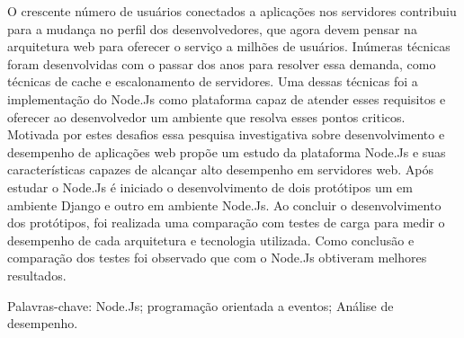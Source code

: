 \begin{resumo}
\vspace{-1cm}

\onehalfspacing

\noindent
  
  O crescente número de usuários conectados a aplicações nos servidores contribuiu
  para  a mudança no perfil dos desenvolvedores, que agora devem pensar na arquitetura web 
  para oferecer o serviço a milhões de usuários. Inúmeras técnicas foram desenvolvidas 
  com o passar dos anos para resolver essa demanda, como técnicas de cache e escalonamento de servidores.
  Uma dessas técnicas foi a implementação do Node.Js como plataforma capaz de atender esses requisitos
  e oferecer ao desenvolvedor um ambiente que resolva esses pontos criticos. Motivada por estes desafios
  essa pesquisa investigativa sobre desenvolvimento e desempenho de aplicações web propõe um estudo da plataforma
  Node.Js e suas características capazes de alcançar alto desempenho em servidores web. Após estudar o Node.Js 
  é iniciado o desenvolvimento de dois protótipos um em ambiente Django e outro em ambiente Node.Js. 
  Ao concluir o desenvolvimento dos protótipos, foi realizada uma comparação com testes
  de carga para medir o desempenho de cada arquitetura e tecnologia utilizada. Como conclusão e comparação dos testes 
  foi observado que com o Node.Js obtiveram melhores resultados. 
  

\vspace*{.75cm}

\noindent Palavras-chave: Node.Js; programação orientada a eventos; Análise de desempenho.\\

\end{resumo}